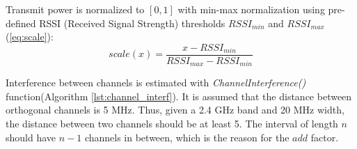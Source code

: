 Transmit power is normalized to $[0,1]$ with min-max normalization using pre-defined RSSI (Received Signal Strength) thresholds $RSSI_{min}$ and $RSSI_{max}$ (\ref{eq:scale}):
\begin{equation}
    \label{eq:scale}
    scale(x) = \frac{x - RSSI_{min}}{RSSI_{max} - RSSI_{min}}
\end{equation}

Interference between channels is estimated with \textit{ChannelInterference()} function(Algorithm \ref{lst:channel_interf}). It is assumed that the distance between orthogonal channels is 5 MHz. Thus, given a 2.4 GHz band and 20 MHz width, the distance between two channels should be at least 5. The interval of length $n$ should have $n-1$ channels in between, which is the reason for the $add$ factor.



